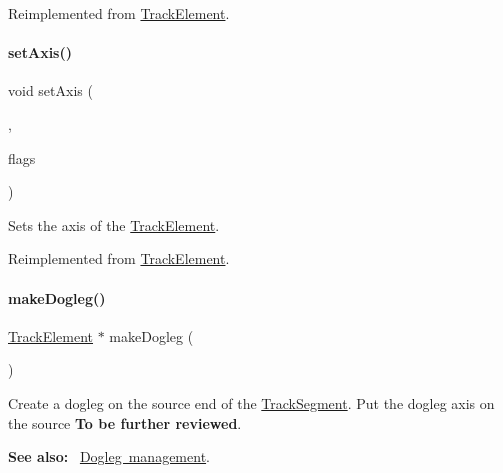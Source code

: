 Reimplemented from \mbox{\hyperlink{classKite_1_1TrackElement_a5bd93abe1416952ace15a98dbeeed124}{Track\+Element}}.

\mbox{\label{classKite_1_1TrackSegment_a262a915c38127d3722ec561b30d80f91}} 
\paragraph{\texorpdfstring{set\+Axis()}{setAxis()}}
{\footnotesize\ttfamily void set\+Axis (\begin{DoxyParamCaption}\item[{\textbf{ Db\+U\+::\+Unit}}]{,  }\item[{unsigned int}]{flags }\end{DoxyParamCaption})\hspace{0.3cm}{\ttfamily [virtual]}}

Sets the axis of the \mbox{\hyperlink{classKite_1_1TrackElement}{Track\+Element}}. 

Reimplemented from \mbox{\hyperlink{classKite_1_1TrackElement_a45e685b1e3ee630d24bf43746553af4c}{Track\+Element}}.

\mbox{\label{classKite_1_1TrackSegment_a7a9637875364e84e6862de0102341715}} 
\paragraph{\texorpdfstring{make\+Dogleg()}{makeDogleg()}\hspace{0.1cm}{\footnotesize\ttfamily [1/2]}}
{\footnotesize\ttfamily \mbox{\hyperlink{classKite_1_1TrackElement}{Track\+Element}} $\ast$ make\+Dogleg (\begin{DoxyParamCaption}{ }\end{DoxyParamCaption})\hspace{0.3cm}{\ttfamily [virtual]}}

Create a dogleg on the source end of the \mbox{\hyperlink{classKite_1_1TrackSegment}{Track\+Segment}}. Put the dogleg axis on the source {\bfseries To be further reviewed}.

{\bfseries See also\+:}~ \mbox{\hyperlink{classKite_1_1TrackSegment_secDogleg}{Dogleg management}}.

